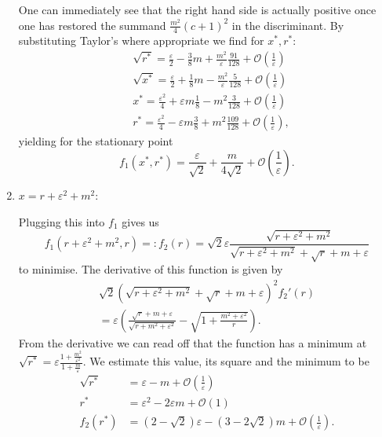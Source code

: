 \documentclass[b5paper,draft,openbib,12pt]{memoir}
\begin{document}
\begin{enumerate}[label=case \alph*),]
One can immediately see that the right hand side is actually positive once one 
has restored the summand \(\frac{m^2}{4}(c+1)^2\) in the discriminant. 
By substituting Taylor's where appropriate we find for \(x^*,r^*\):
\begin{align*}
&\sqrt{r^*}=\frac{\varepsilon}{2}- \frac{3}{8} m + \frac{m^2}{\varepsilon} \frac{91}{128} + \mathcal{O}\left(\frac{1}{\varepsilon}\right)\\
&\sqrt{x^*}=\frac{\varepsilon}{2}+ \frac{1}{8} m - \frac{m^2}{\varepsilon} \frac{5}{128} + \mathcal{O}\left(\frac{1}{\varepsilon}\right)\\
&x^*=\frac{\varepsilon^2}{4} + \varepsilon m \frac{1}{8} - m^2 \frac{3}{128}+ \mathcal{O}\left(\frac{1}{\varepsilon}\right)\\
&r^*=\frac{\varepsilon^2}{4} - \varepsilon m \frac{3}{8} + m^2 \frac{109}{128}+ \mathcal{O}\left(\frac{1}{\varepsilon}\right),
\end{align*}
yielding for the stationary point
\begin{equation}
f_1(x^*,r^*)= \frac{\varepsilon}{\sqrt{2}} + \frac{m}{4 \sqrt{2}}+ \mathcal{O}\left(\frac{1}{\varepsilon}\right).
\end{equation}
 
\item \label{bla} \(x=r+\varepsilon^2+m^2\):

Plugging this into \(f_1\) gives us
\begin{equation*}
f_1(r+\varepsilon^2+m^2,r)=:f_2(r)= \sqrt{2} \varepsilon \frac{\sqrt{r+\varepsilon^2+m^2}}{\sqrt{r+\varepsilon^2+m^2}+\sqrt{r}+m+\varepsilon}
\end{equation*}
to minimise. The derivative of this function is given by
\begin{multline*}
\sqrt{2} (\sqrt{r+\varepsilon^2+m^2}+\sqrt{r}+m+\varepsilon)^2 f_2'(r)\\
= \varepsilon \left( \frac{\sqrt{r}+m+\varepsilon}{\sqrt{r+m^2+\varepsilon^2}}- \sqrt{1+\frac{m^2+\varepsilon^2}{r}}\right).
\end{multline*}
From the derivative we can read off that the function has a minimum at 
\(\sqrt{r^*}=\varepsilon \frac{1+\frac{m^2}{\varepsilon^2}}{1+\frac{m}{\varepsilon}}\).
We estimate this value, its square and the minimum to be
\begin{align}\tag*{}
\sqrt{r^*}&= \varepsilon - m + \mathcal{O}\left( \frac{1}{\varepsilon}\right)\\ \tag*{}
r^*&= \varepsilon^2 - 2 \varepsilon m +\mathcal{O}\left( 1\right)\\
f_2(r^*)&= (2-\sqrt{2})\varepsilon - (3-2\sqrt{2})m + \mathcal{O}\left( \frac{1}{\varepsilon}\right).
\end{align}


\end{enumerate}
\end{document}
